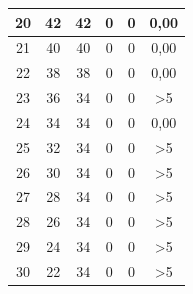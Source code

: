\begin{longtable}{|c|c|c|c|c|c|}
 		20                                           & 42                     & 42                    & 0                     & 0                      & 0,00                                               \\ \hline
 		21                                           & 40                     & 40                    & 0                     & 0                      & 0,00                                               \\ \hline
 		22                                           & 38                     & 38                    & 0                     & 0                      & 0,00                                               \\ \hline
 		23                                           & 36                     & 34                    & 0                     & 0                      & >5                                               \\ \hline
 		24                                           & 34                     & 34                    & 0                     & 0                      & 0,00                                               \\ \hline
 		25                                           & 32                     & 34                    & 0                     & 0                      & >5                                               \\ \hline
 		26                                           & 30                     & 34                    & 0                     & 0                      & >5                                              \\ \hline
 		27                                           & 28                     & 34                    & 0                     & 0                      & >5                                              \\ \hline
 		28                                           & 26                     & 34                    & 0                     & 0                      & >5                                              \\ \hline
 		29                                           & 24                     & 34                    & 0                     & 0                      & >5                                              \\ \hline
 		30                                           & 22                     & 34                    & 0                     & 0                      & >5                                              \\ \hline

\end{longtable}
